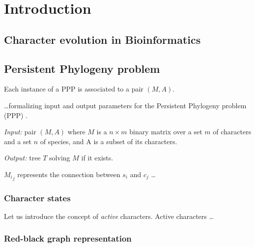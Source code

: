 
\section{Introduction}\label{sec:introduction}


\subsection{Character evolution in Bioinformatics}\label{ssec:charevo}


\subsection{Persistent Phylogeny problem}


Each instance of a PPP is associated to a pair $(M, A)$.

 \dots formalizing input and output parameters for the Persistent Phylogeny problem (PPP) \cite{Bonizzoni2016SolvingTP}.

\begin{Definition}\label{ppp}
  \text{}

  \textit{Input:} pair $(M, A)$ where $M$ is a $n \times m$ binary matrix over a set $m$ of characters and a set $n$ of species, and A is a subset of its characters.

  \textit{Output:} tree $T$ solving $M$ if it exists.
\end{Definition}

${M_i}_j$ represents the connection between $s_i$ and $c_j$ \dots

\subsubsection{Character states}

Let us introduce the concept of \textit{active} characters.
Active characters  \dots

\subsubsection{Red-black graph representation}


